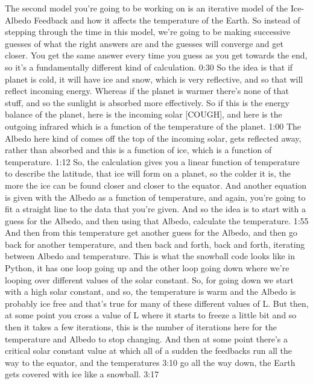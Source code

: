 The second model you're going to be working on is an iterative model of the Ice-Albedo Feedback and how it affects the temperature of the Earth. So instead of stepping through the time in this model, we're going to be making successive guesses of what the right answers are and the guesses will converge and get closer. You get the same answer every time you guess as you get towards the end, so it's a fundamentally different kind of calculation. 
0:30
So the idea is that if planet is cold, it will have ice and snow, which is very reflective, and so that will reflect incoming energy. Whereas if the planet is warmer there's none of that stuff, and so the sunlight is absorbed more effectively. So if this is the energy balance of the planet, here is the incoming solar [COUGH], and here is the outgoing infrared which is a function of the temperature of the planet. 
1:00
The Albedo here kind of comes off the top of the incoming solar, gets reflected away, rather than absorbed and this is a function of ice, which is a function of temperature. 
1:12
So, the calculation gives you a linear function of temperature to describe the latitude, that ice will form on a planet, so the colder it is, the more the ice can be found closer and closer to the equator. And another equation is given with the Albedo as a function of temperature, and again, you're going to fit a straight line to the data that you're given. And so the idea is to start with a guess for the Albedo, and then using that Albedo, calculate the temperature. 
1:55
And then from this temperature get another guess for the Albedo, and then go back for another temperature, and then back and forth, back and forth, iterating between Albedo and temperature. This is what the snowball code looks like in Python, it has one loop going up and the other loop going down where we're looping over different values of the solar constant. So, for going down we start with a high solar constant, and so, the temperature is warm and the Albedo is probably ice free and that's true for many of these different values of L. But then, at some point you cross a value of L where it starts to freeze a little bit and so then it takes a few iterations, this is the number of iterations here for the temperature and Albedo to stop changing. And then at some point there's a critical solar constant value at which all of a sudden the feedbacks run all the way to the equator, and the temperatures 
3:10
go all the way down, the Earth gets covered with ice like a snowball. 
3:17
